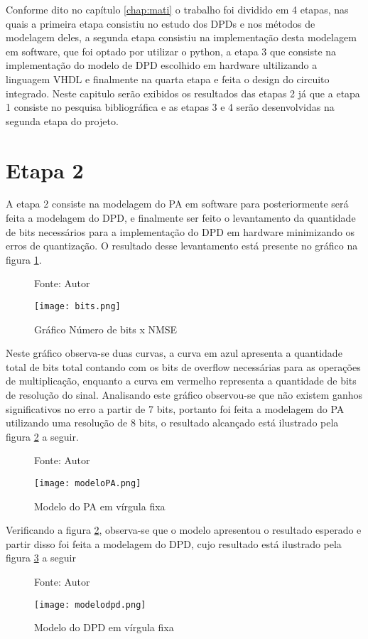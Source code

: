 Conforme dito no capítulo \ref{chap:mati} o trabalho foi dividido em 4 etapas, nas quais a primeira etapa consistiu no estudo dos DPDs e nos métodos de modelagem deles, a segunda etapa consistiu na implementação desta modelagem em software, que foi optado por utilizar o python, a etapa 3 que consiste na implementação do modelo de DPD escolhido em hardware ultilizando a linguagem VHDL e finalmente na quarta etapa e feita o design do circuito integrado.
Neste capitulo serão exibidos os resultados das etapas 2 já que a etapa 1 consiste no pesquisa bibliográfica e as etapas 3 e 4 serão desenvolvidas na segunda etapa do projeto.

\section{Etapa 2}
A etapa 2 consiste na modelagem do PA em software para posteriormente será feita a modelagem do DPD, e finalmente ser feito o levantamento da quantidade de bits necessários para a implementação do DPD em hardware minimizando os erros de quantização. 
O resultado desse levantamento está presente no gráfico na figura \ref{fig:bits}.
\begin{figure}[ht!]
    \centering
    \captionsetup{justification=centering}
    \caption*{Fonte: Autor}
    \texttt{[image: bits.png]}
    \caption{Gráfico Número de bits x NMSE}
    \label{fig:bits}
\end{figure}


Neste gráfico observa-se duas curvas, a curva em azul apresenta a quantidade total de bits total contando com os bits de overflow necessárias para as operações de multiplicação, enquanto a curva em vermelho representa a quantidade de bits de resolução do sinal. Analisando este gráfico observou-se que não existem ganhos significativos no erro a partir de 7 bits, portanto foi feita a modelagem do PA utilizando uma resolução de 8 bits, o resultado alcançado está ilustrado pela figura \ref{fig:modelopa} a seguir.
\begin{figure}[ht!]
    \centering
    \captionsetup{justification=centering}
    \caption*{Fonte: Autor}
    \texttt{[image: modeloPA.png]}
    \caption{Modelo do PA em vírgula fixa}
    \label{fig:modelopa}
\end{figure}

Verificando a figura \ref{fig:modelopa}, observa-se que o modelo apresentou o resultado esperado e partir disso foi feita a modelagem do DPD, cujo resultado está ilustrado pela figura \ref{fig:modelodpd} a seguir

\begin{figure}[ht!]
    \centering
    \captionsetup{justification=centering}
    \caption*{Fonte: Autor}
    \texttt{[image: modelodpd.png]}
    \caption{Modelo do DPD em vírgula fixa}
    \label{fig:modelodpd}
\end{figure}